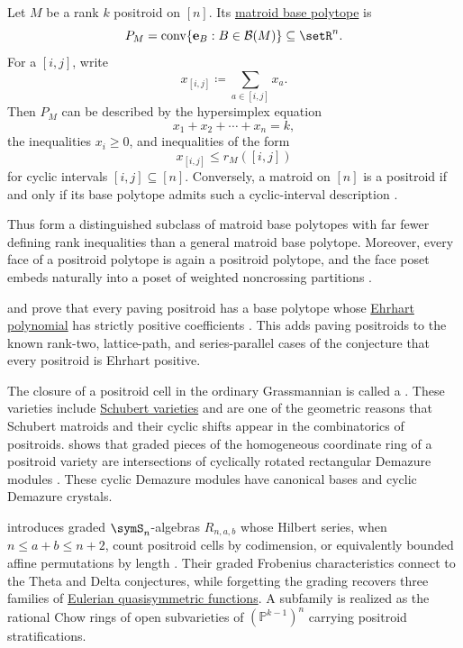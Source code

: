 Let $M$ be a rank $k$ positroid on $[n]$.  Its
\hyperref[matroidBasePolytope]{matroid base polytope} is
\[
  P_M = \operatorname{conv}\{\mathbf{e}_B : B\in \mathcal{B}(M)\}
  \subseteq \setR^n.
\]
For a \label{cyclicIntervalDefinition} $[i,j]$, write
\[
  x_{[i,j]} \coloneqq \sum_{a\in [i,j]} x_a.
\]
Then $P_M$ can be described by the hypersimplex equation
\[
  x_1+x_2+\dotsb+x_n = k,
\]
the inequalities $x_i\geq 0$, and inequalities of the form
\[
  x_{[i,j]} \leq r_M([i,j])
\]
for cyclic intervals $[i,j]\subseteq [n]$.  Conversely, a matroid on $[n]$ is
a positroid if and only if its base polytope admits such a cyclic-interval
description \cite{ArdilaRinconWilliams2014}.

Thus \label{positroidPolytopeDefinition} form a
distinguished subclass of matroid base polytopes with far fewer defining rank
inequalities than a general matroid base polytope.  Moreover, every face of a
positroid polytope is again a positroid polytope, and the face poset embeds
naturally into a poset of weighted noncrossing partitions
\cite{ArdilaRinconWilliams2014}.

 and  prove that every paving positroid has
a base polytope whose \hyperref[ehrhartPolynomialDefinition]{Ehrhart
polynomial} has strictly positive coefficients \cite{LiuZhang2026x}.  This
adds paving positroids to the known rank-two, lattice-path, and
series-parallel cases of the conjecture that every positroid is Ehrhart
positive.

The closure of a positroid cell in the ordinary Grassmannian is called a
\label{positroidVarietyDefinition}.  These varieties
include \hyperref[schubertVarietyGeometryDefinition]{Schubert varieties} and
are one of the geometric reasons that Schubert matroids and their cyclic shifts
appear in the combinatorics of positroids.
 shows that graded pieces of the homogeneous coordinate ring
of a positroid variety are intersections of cyclically rotated rectangular
Demazure modules \cite{Lam2019}.  These cyclic Demazure modules have canonical
bases and cyclic Demazure crystals.

 introduces graded $\symS_n$-algebras $R_{n,a,b}$ whose Hilbert
series, when $n\leq a+b\leq n+2$, count positroid cells by codimension, or
equivalently bounded affine permutations by length
\cite{Zhu2026PositroidAlgebrasx}.  Their graded Frobenius characteristics
connect to the Theta and Delta conjectures, while forgetting the grading
recovers three families of
\hyperref[eulerianSymmetric]{Eulerian quasisymmetric functions}.  A subfamily
is realized as the rational Chow rings of open subvarieties of
$(\mathbb{P}^{k-1})^n$ carrying positroid stratifications.
